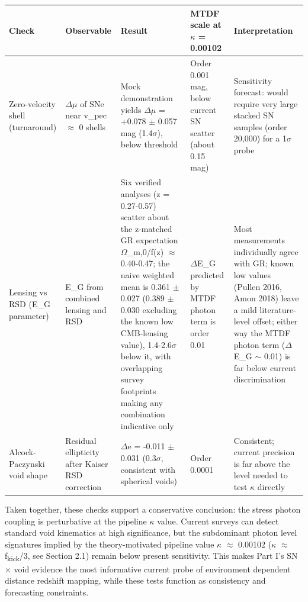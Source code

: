 \documentclass[11pt,a4paper]{article}
\begin{document}
\begin{table}[H]
\centering
\footnotesize
\begin{tabularx}{\linewidth}{l>{\RaggedRight\arraybackslash}X>{\RaggedRight\arraybackslash}X>{\RaggedRight\arraybackslash}X>{\RaggedRight\arraybackslash}X}
\toprule
\textbf{Check} & \textbf{Observable} & \textbf{Result} & \textbf{MTDF scale at $\kappa$ = 0.00102} & \textbf{Interpretation} \tabularnewline
\midrule
Zero-velocity shell (turnaround) & $\Delta$$\mu$ of SNe near v\_\allowbreak{}pec $\approx$ 0 shells & Mock demonstration yields $\Delta$$\mu$ = +0.078 $\pm$ 0.057 mag (1.4$\sigma$), below threshold & Order 0.001 mag, below current SN scatter (about 0.15 mag) & Sensitivity forecast: would require very large stacked SN samples (order 20,000) for a 1$\sigma$ probe \tabularnewline
Lensing vs RSD (E\_\allowbreak{}G parameter) & E\_\allowbreak{}G from combined lensing and RSD & Six verified analyses (z = 0.27-0.57) scatter about the z-matched GR expectation $\Omega$\_\allowbreak{}m,0/\allowbreak{}f(z) $\approx$ 0.40-0.47; the naive weighted mean is 0.361 $\pm$ 0.027 (0.389 $\pm$ 0.030 excluding the known low CMB-lensing value), 1.4-2.6$\sigma$ below it, with overlapping survey footprints making any combination indicative only & $\Delta$E\_\allowbreak{}G predicted by MTDF photon term is order 0.01 & Most measurements individually agree with GR; known low values (Pullen 2016, Amon 2018) leave a mild literature-level offset; either way the MTDF photon term ($\Delta$E\_\allowbreak{}G  $\sim$ 0.01) is far below current discrimination \tabularnewline
Alcock-Paczynski void shape & Residual ellipticity after Kaiser RSD correction & $\Delta$e = -0.011 $\pm$ 0.031 (0.3$\sigma$, consistent with spherical voids) & Order 0.0001 & Consistent; current precision is far above the level needed to test $\kappa$ directly \tabularnewline
\bottomrule
\end{tabularx}
\end{table}

Taken together, these checks support a conservative conclusion: the stress photon coupling is perturbative at the pipeline $\kappa$ value. Current surveys can detect standard void kinematics at high significance, but the subdominant photon level signatures implied by the theory-motivated pipeline value $\kappa$ $\approx$ 0.00102 ($\kappa$ $\approx$ f\textsubscript{kick}/3, see Section 2.1) remain below present sensitivity. This makes Part I's SN $\times$ void evidence the most informative current probe of environment dependent distance redshift mapping, while these tests function as consistency and forecasting constraints.
\end{document}
